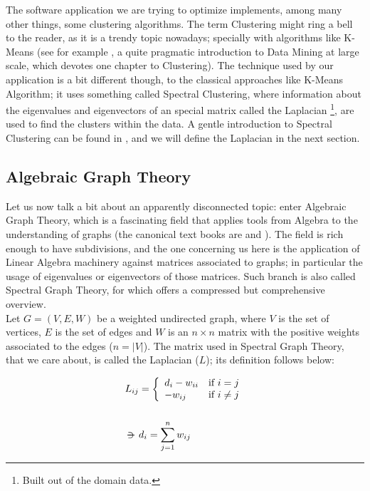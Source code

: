 The software application we are trying to optimize implements, among
many other things, some clustering
algorithms. The term Clustering might
ring a bell to the reader, as it is a trendy topic nowadays; specially
with algorithms like K-Means (see for example \cite{rajaraman14}, a
quite pragmatic 
introduction to Data Mining at large scale, which devotes one chapter
to Clustering). The technique used by our application is a bit
different though, to the classical approaches like K-Means Algorithm;
it uses something called Spectral Clustering, where information about the
eigenvalues and eigenvectors of an special matrix called the Laplacian
\footnote{Built out of the domain data.}, are used to find the clusters
within the data. A gentle introduction to Spectral Clustering can be
found in \cite{luxburg07}, and we will define the Laplacian
in the next section. \\

\subsection{Algebraic Graph Theory}

Let us now talk a bit about an apparently disconnected topic: enter
Algebraic Graph Theory, which is a fascinating field that 
applies tools from Algebra to the understanding of graphs
(the canonical text books are \cite{biggs93} and \cite{godsil01}). The field
is rich enough to have subdivisions, and the one concerning us here is
the application of Linear Algebra machinery against matrices
associated to graphs; in particular the usage of eigenvalues or
eigenvectors of those matrices. Such branch is also called
Spectral Graph Theory, for which \cite{brouwer12} offers a compressed but
comprehensive overview. \\

Let $G = (V,E,W)$ be a weighted undirected graph, where $V$ is the set
of vertices, $E$ is the set of edges and $W$ is an $n \times n$ matrix
with the positive weights associated to the edges ($n = |V|$). The
matrix used in Spectral Graph Theory, that we care about, is
called the Laplacian ($L$); its definition follows below: 

\begin{align*}
  L_{ij} &= \twopartdef{d_i - w_{ii}}{i = j}{-w_{ij}}{i \ne j} \\\\
    \suchthat & d_i = \sum_{j=1}^n w_{ij}
\end{align*}
\hfill

